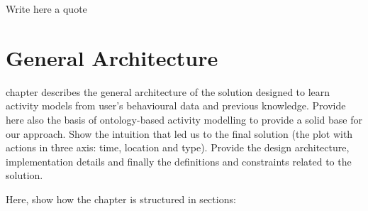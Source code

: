 

\begin{savequote}[50mm]
Write here a quote
\end{savequote}


\chapter{General Architecture}
\label{cha:archi}

\ifpdf
    \graphicspath{{3_weblabdeusto/figures/PDF/}{3_weblabdeusto/figures/PNG/}{3_weblabdeusto/figures/}}
\else
    \graphicspath{{3_weblabdeusto/figures/EPS/}{3_weblabdeusto/figures/}}
\fi

 chapter describes the general architecture of the solution designed to learn activity models from user's behavioural data and previous knowledge. Provide here also the basis of ontology-based activity modelling to provide a solid base for our approach. Show the intuition that led us to the final solution (the plot with actions in three axis: time, location and type). Provide the design architecture, implementation details and finally the definitions and constraints related to the solution.

Here, show how the chapter is structured in sections:
